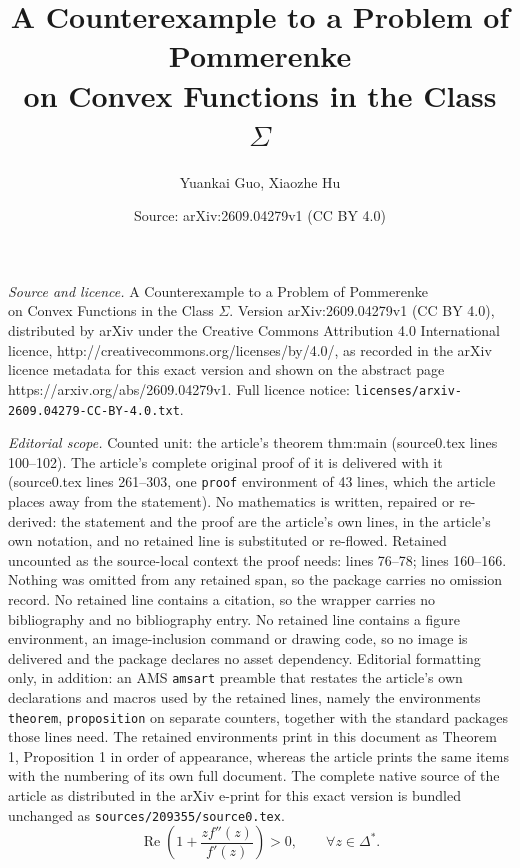 \documentclass[10pt,a4paper]{amsart}
\title{A Counterexample to a Problem of Pommerenke\\on Convex Functions in the Class \texorpdfstring{$\Sigma$}{Sigma}}
\author{Yuankai Guo, Xiaozhe Hu}
\date{Source: arXiv:2609.04279v1 (CC BY 4.0)}
\renewcommand{\Re}{\operatorname{Re}}
\begin{document}
\maketitle

\noindent\emph{Source and licence.} A Counterexample to a Problem of Pommerenke\\on Convex Functions in the Class \texorpdfstring{$\Sigma$}{Sigma}. Version arXiv:2609.04279v1 (CC BY 4.0), distributed by arXiv under the Creative Commons Attribution 4.0 International licence, http://creativecommons.org/licenses/by/4.0/, as recorded in the arXiv licence metadata for this exact version and shown on the abstract page https://arxiv.org/abs/2609.04279v1. Full licence notice: \texttt{licenses/arxiv-2609.04279-CC-BY-4.0.txt}.\par\smallskip

\noindent\textit{Editorial scope.} Counted unit: the article's theorem thm:main (source0.tex lines 100--102). The article's complete original proof of it is delivered with it (source0.tex lines 261--303, one \texttt{proof} environment of 43 lines, which the article places away from the statement). No mathematics is written, repaired or re-derived: the statement and the proof are the article's own lines, in the article's own notation, and no retained line is substituted or re-flowed.  Retained uncounted as the source-local context the proof needs: lines 76--78; lines 160--166.  Nothing was omitted from any retained span, so the package carries no omission record.  No retained line contains a citation, so the wrapper carries no bibliography and no bibliography entry.  No retained line contains a figure environment, an image-inclusion command or drawing code, so no image is delivered and the package declares no asset dependency.  Editorial formatting only, in addition: an AMS \texttt{amsart} preamble that restates the article's own declarations and macros used by the retained lines, namely the environments \texttt{theorem}, \texttt{proposition} on separate counters, together with the standard packages those lines need.  The retained environments print in this document as Theorem 1, Proposition 1 in order of appearance, whereas the article prints the same items with the numbering of its own full document.  The complete native source of the article as distributed in the arXiv e-print for this exact version is bundled unchanged as \texttt{sources/209355/source0.tex}.
\begin{equation}\label{eq:convex-criterion}
\Re\left(1 + \frac{z f''(z)}{f'(z)}\right) > 0, \qquad \forall z \in \Delta^*.
\end{equation}
\end{document}
